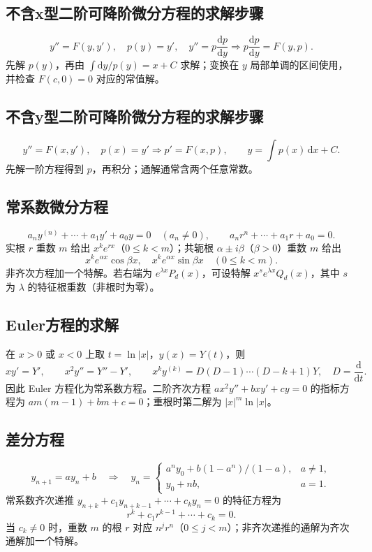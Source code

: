 \documentclass[../main.tex]{subfiles}
\begin{document}
\subsection{不含x型二阶可降阶微分方程的求解步骤}
\[
y''=F(y,y'),\quad p(y)=y',\quad y''=p\frac{\mathrm dp}{\mathrm dy}
\Longrightarrow p\frac{\mathrm dp}{\mathrm dy}=F(y,p).
\]
先解 $p(y)$，再由 $\int\mathrm dy/p(y)=x+C$ 求解；变换在 $y$ 局部单调的区间使用，并检查 $F(c,0)=0$ 对应的常值解。
\subsection{不含y型二阶可降阶微分方程的求解步骤}
\[
y''=F(x,y'),\quad p(x)=y'\Longrightarrow p'=F(x,p),\qquad
y=\int p(x)\,\mathrm dx+C.
\]
先解一阶方程得到 $p$，再积分；通解通常含两个任意常数。
\subsection{常系数微分方程}
\[
a_ny^{(n)}+\cdots+a_1y'+a_0y=0\quad(a_n\ne0),\qquad
 a_nr^n+\cdots+a_1r+a_0=0.
\]
实根 $r$ 重数 $m$ 给出 $x^ke^{rx}$（$0\le k<m$）；共轭根 $\alpha\pm i\beta$（$\beta>0$）重数 $m$ 给出
\[
x^ke^{\alpha x}\cos\beta x,\quad x^ke^{\alpha x}\sin\beta x\quad(0\le k<m).
\]
非齐次方程加一个特解。若右端为 $e^{\lambda x}P_d(x)$，可设特解 $x^se^{\lambda x}Q_d(x)$，其中 $s$ 为 $\lambda$ 的特征根重数（非根时为零）。
\subsection{Euler方程的求解}
在 $x>0$ 或 $x<0$ 上取 $t=\ln|x|$，$y(x)=Y(t)$，则
\[
xy'=Y',\qquad x^2y''=Y''-Y',\qquad
x^ky^{(k)}=D(D-1)\cdots(D-k+1)Y,\quad D=\frac{\mathrm d}{\mathrm dt}.
\]
因此 Euler 方程化为常系数方程。二阶齐次方程 $ax^2y''+bxy'+cy=0$ 的指标方程为 $am(m-1)+bm+c=0$；重根时第二解为 $|x|^m\ln|x|$。
\subsection{差分方程}
\[
y_{n+1}=ay_n+b\quad\Longrightarrow\quad
 y_n=\begin{cases}a^ny_0+b(1-a^n)/(1-a),&a\ne1,\\y_0+nb,&a=1.\end{cases}
\]
常系数齐次递推 $y_{n+k}+c_1y_{n+k-1}+\cdots+c_ky_n=0$ 的特征方程为
\[
r^k+c_1r^{k-1}+\cdots+c_k=0.
\]
当 $c_k\ne0$ 时，重数 $m$ 的根 $r$ 对应 $n^jr^n$（$0\le j<m$）；非齐次递推的通解为齐次通解加一个特解。
\end{document}
